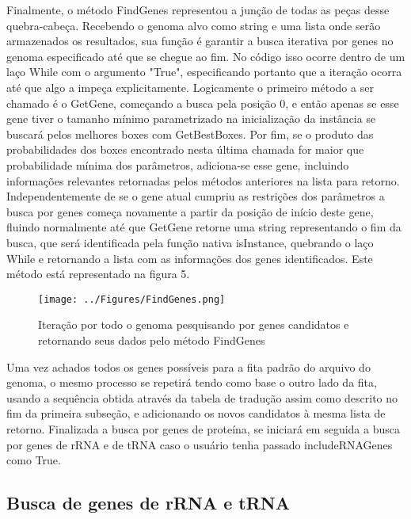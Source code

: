 \documentclass[brazilian,12pt,a4paper,final]{article}
\begin{document}
	
	\vspace{0.5cm}
	Finalmente, o método FindGenes representou a junção de todas as peças desse quebra-cabeça. Recebendo o genoma alvo como string e uma lista onde serão armazenados os resultados, sua função é garantir a busca iterativa por genes no genoma especificado até que se chegue ao fim. No código isso ocorre dentro de um laço While com o argumento "True", especificando portanto que a iteração ocorra até que algo a impeça explicitamente. Logicamente o primeiro método a ser chamado é o GetGene, começando a busca pela posição 0, e então apenas se esse gene tiver o tamanho mínimo parametrizado na inicialização da instância se buscará pelos melhores boxes com GetBestBoxes. Por fim, se o produto das probabilidades dos boxes encontrado nesta última chamada for maior que probabilidade mínima dos parâmetros, adiciona-se esse gene, incluindo informações relevantes retornadas pelos métodos anteriores na lista para retorno. Independentemente de se o gene atual cumpriu as restrições dos parâmetros a busca por genes começa novamente a partir da posição de início deste gene, fluindo normalmente até que GetGene retorne uma string representando o fim da busca, que será identificada pela função nativa isInstance, quebrando o laço While e retornando a lista com as informações dos genes identificados. Este método está representado na figura 5.
	
	\vspace{0.5cm}
	
	\begin{figure}[hbtp]
		\begin{center}
			\texttt{[image: ../Figures/FindGenes.png]}
			\caption{Iteração por todo o genoma pesquisando por genes candidatos e retornando seus dados pelo método FindGenes}
			\label{fig}
		\end{center}
	\end{figure}
	
	Uma vez achados todos os genes possíveis para a fita padrão do arquivo do genoma, o mesmo processo se repetirá tendo como base o outro lado da fita, usando a sequência obtida através da tabela de tradução assim como descrito no fim da primeira subseção, e adicionando os novos candidatos à mesma lista de retorno.
	Finalizada a busca por genes de proteína, se iniciará em seguida a busca por genes de rRNA e de tRNA caso o usuário tenha passado includeRNAGenes como True.
	
	\subsection{Busca de genes de rRNA e tRNA}
\end{document}
